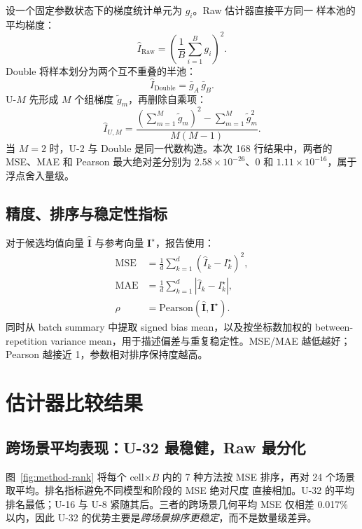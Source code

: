 \documentclass[11pt,a4paper]{ctexart}
\newcommand{\method}[1]{\textsf{#1}}
\begin{document}
设一个固定参数状态下的梯度统计单元为 $g_i$。Raw 估计器直接平方同一
样本池的平均梯度：
\begin{equation}
  \widehat I_{\mathrm{Raw}}
  =\left(\frac{1}{B}\sum_{i=1}^{B}g_i\right)^2.
\end{equation}
Double 将样本划分为两个互不重叠的半池：
\begin{equation}
  \widehat I_{\mathrm{Double}}=\bar g_A\,\bar g_B.
\end{equation}
U-$M$ 先形成 $M$ 个组梯度 $\tilde g_m$，再删除自乘项：
\begin{equation}
  \widehat I_{U,M}
  =\frac{\left(\sum_{m=1}^{M}\tilde g_m\right)^2
  -\sum_{m=1}^{M}\tilde g_m^2}{M(M-1)}.
\end{equation}
当 $M=2$ 时，U-2 与 Double 是同一代数构造。本次 168 行结果中，两者的
MSE、MAE 和 Pearson 最大绝对差分别为 $2.58\times10^{-26}$、0 和
$1.11\times10^{-16}$，属于浮点舍入量级。

\subsection{精度、排序与稳定性指标}

对于候选均值向量 $\widehat{\boldsymbol I}$ 与参考向量
$\boldsymbol I^{\star}$，报告使用：
\begin{align}
  \mathrm{MSE} &= \frac{1}{d}\sum_{k=1}^{d}
  (\widehat I_k-I_k^{\star})^2,\\
  \mathrm{MAE} &= \frac{1}{d}\sum_{k=1}^{d}
  |\widehat I_k-I_k^{\star}|,\\
  \rho &= \mathrm{Pearson}(\widehat{\boldsymbol I},\boldsymbol I^{\star}).
\end{align}
同时从 batch summary 中提取 signed bias mean，以及按坐标数加权的
between-repetition variance mean，用于描述偏差与重复稳定性。MSE/MAE
越低越好；Pearson 越接近 1，参数相对排序保持度越高。

\section{估计器比较结果}

\subsection{跨场景平均表现：U-32 最稳健，Raw 最分化}

图~\ref{fig:method-rank} 将每个 cell$\times B$ 内的 7 种方法按 MSE
排序，再对 24 个场景取平均。排名指标避免不同模型和阶段的 MSE 绝对尺度
直接相加。\method{U-32} 的平均排名最低；\method{U-16} 与 \method{U-8}
紧随其后。三者的跨场景几何平均 MSE 仅相差 0.017\% 以内，因此
\method{U-32} 的优势主要是\emph{跨场景排序更稳定}，而不是数量级差异。
\end{document}
